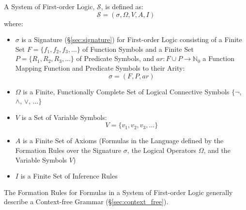A System of First-order Logic, $\mathcal{S}$, is defined as:
\[
  \mathcal{S} = (\sigma,\Omega,V,A,I)
\]
where:
\begin{itemize}
  \item $\sigma$ is a Signature (\S\ref{sec:signature}) for
    First-order Logic consisting of a Finite Set $F = \{f_1, f_2, f_3,
    \ldots \}$ of Function Symbols and a Finite Set $P = \{ R_1, R_2,
    R_3, \ldots\}$ of Predicate Symbols, and $ar : F \cup P
    \rightarrow \mathbb{N}_0$ a Function Mapping Function and
    Predicate Symbols to their Arity:
    \[\sigma = (F,P,ar)\]
  \item $\Omega$ is a Finite, Functionally Complete Set of Logical
    Connective Symbols $\{\neg$, $\wedge$, $\vee$, $\ldots\}$
  \item $V$ is a Set of Variable Symbols:
    \[V = \{v_1, v_2, v_3, \ldots\}\]
  \item $A$ is a Finite Set of Axioms (Formulas in the Language
    defined by the Formation Rules over the Signature $\sigma$, the
    Logical Operators $\Omega$, and the Variable Symbols $V$)
  \item $I$ is a Finite Set of Inference Rules
\end{itemize}

The Formation Rules for Formulas in a System of First-order Logic
generally describe a Context-free Grammar (\S\ref{sec:context_free}).


